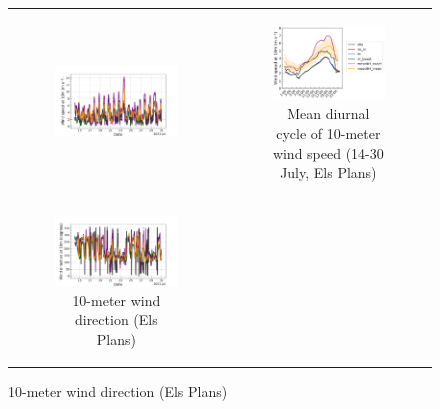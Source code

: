 \begin{figure}[t]
\begin{tabular}{cc}
\begin{subfigure}[t]{0.5\textwidth}
            \includegraphics[width=\textwidth]{images/chap5/SOP_TS_DC/time_series_elsplans_wind_speed_10m.png}
        \end{subfigure} &
        \begin{subfigure}[t]{0.5\textwidth}
            \caption{Mean diurnal cycle of 10-meter wind speed (14-30 July, Els Plans)}
            \includegraphics[width=\textwidth]{images/chap5/SOP_TS_DC/diurnal_cycle_elsplans_wind_speed_10m.png}
        \end{subfigure} \\
        \begin{subfigure}[t]{0.5\textwidth}
            \caption{10-meter wind direction (Els Plans)}
            \includegraphics[width=\textwidth]{images/chap5/SOP_TS_DC/time_series_elsplans_wind_direction_10m.png}

\end{subfigure}
\end{tabular}
\end{figure}

